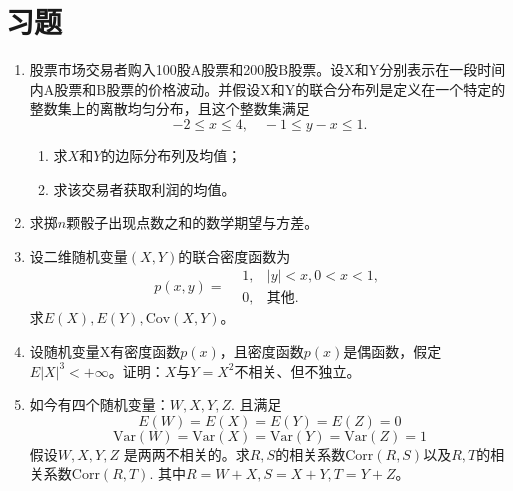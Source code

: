 \section{习题}
\begin{enumerate}
    \item 股票市场交易者购入100股A股票和200股B股票。设X和Y分别表示在一段时间内A股票和B股票的价格波动。并假设X和Y的联合分布列是定义在一个特定的整数集上的离散均匀分布，且这个整数集满足
$$-2\leq x\leq 4,\quad -1\leq y-x\leq 1.$$
\begin{enumerate}
    \item 求$X$和$Y$的边际分布列及均值；
\item 求该交易者获取利润的均值。
\end{enumerate}
\item 求掷$n$颗骰子出现点数之和的数学期望与方差。
\item 设二维随机变量$(X,Y)$的联合密度函数为
$$
p(x,y) = \begin{aligned}
    & 1, &  |y| < x,0 < x < 1,\\
    & 0, & \text{其他}.
\end{aligned}
$$
求$E(X),E(Y),\text{Cov}(X,Y)$。

\item  设随机变量X有密度函数$p(x)$，且密度函数$p(x)$是偶函数，假定$E|X|^3 < +\infty$。证明：$X$与$Y = X^2$不相关、但不独立。

\item 如今有四个随机变量：$W, X, Y, Z.$ 且满足
$$
E(W) = E(X) = E(Y) = E(Z) = 0$$
$$
\text{Var}(W) = \text{Var}(X) = \text{Var}(Y) = \text{Var}(Z) = 1
$$
假设$W, X, Y, Z$ 是两两不相关的。求$R,S$的相关系数$\text{Corr}(R,S)$以及$R,T$的相关系数$\text{Corr}(R,T)$. 其中$R = W + X, S = X + Y,T = Y + Z$。
\end{enumerate}